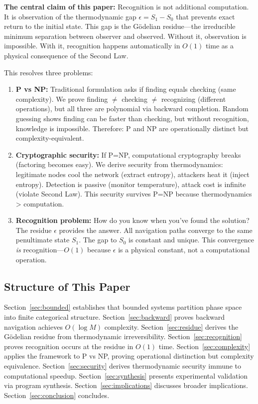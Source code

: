 \documentclass[twocolumn,10pt]{article}
\theoremstyle{definition}
\theoremstyle{remark}
\begin{document}
\vspace{0.2cm}
\noindent\textbf{The central claim of this paper:} Recognition is not additional computation. It is observation of the thermodynamic gap $\epsilon = S_1 - S_0$ that prevents exact return to the initial state. This gap is the Gödelian residue—the irreducible minimum separation between observer and observed. Without it, observation is impossible. With it, recognition happens automatically in $O(1)$ time as a physical consequence of the Second Law.

\vspace{0.2cm}
\noindent This resolves three problems:

\begin{enumerate}
\item \textbf{P vs NP:} Traditional formulation asks if finding equals checking (same complexity). We prove finding $\neq$ checking $\neq$ recognizing (different operations), but all three are polynomial via backward completion. Random guessing shows finding can be faster than checking, but without recognition, knowledge is impossible. Therefore: P and NP are operationally distinct but complexity-equivalent.

\item \textbf{Cryptographic security:} If P=NP, computational cryptography breaks (factoring becomes easy). We derive security from thermodynamics: legitimate nodes cool the network (extract entropy), attackers heat it (inject entropy). Detection is passive (monitor temperature), attack cost is infinite (violate Second Law). This security survives P=NP because thermodynamics > computation.

\item \textbf{Recognition problem:} How do you know when you've found the solution? The residue $\epsilon$ provides the answer. All navigation paths converge to the same penultimate state $S_1$. The gap to $S_0$ is constant and unique. This convergence \textit{is} recognition—$O(1)$ because $\epsilon$ is a physical constant, not a computational operation.
\end{enumerate}

\subsection{Structure of This Paper}

Section~\ref{sec:bounded} establishes that bounded systems partition phase space into finite categorical structure. Section~\ref{sec:backward} proves backward navigation achieves $O(\log M)$ complexity. Section~\ref{sec:residue} derives the Gödelian residue from thermodynamic irreversibility. Section~\ref{sec:recognition} proves recognition occurs at the residue in $O(1)$ time. Section~\ref{sec:complexity} applies the framework to P vs NP, proving operational distinction but complexity equivalence. Section~\ref{sec:security} derives thermodynamic security immune to computational speedup. Section~\ref{sec:synthesis} presents experimental validation via program synthesis. Section~\ref{sec:implications} discusses broader implications. Section~\ref{sec:conclusion} concludes.
\end{document}
